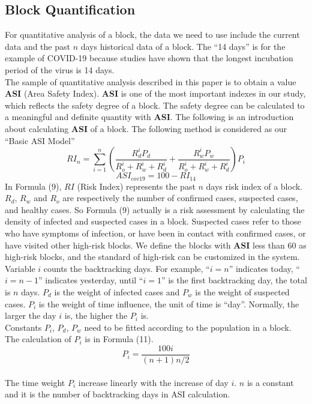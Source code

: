\documentclass[sigplan,screen]{acmart}
\begin{document}
\subsection{Block Quantification}
For quantitative analysis of a block, the data we need to use include the current data and the past $n$ days historical data of a block.
The ``14 days'' is for the example of COVID-19 because studies have shown that the longest incubation period of the virus is 14 days\cite{lauer2020incubation}.
\\
The sample of quantitative analysis described in this paper is to obtain a value \textbf{ASI} (Area Safety Index).
\textbf{ASI} is one of the most important indexes in our study, which reflects the safety degree of a block.
The safety degree can be calculated to a meaningful and definite quantity with \textbf{ASI}.
The following is an introduction about calculating \textbf{ASI} of a block.
The following method is considered as our ``Basic ASI Model''
\begin{equation}
	RI_n=\sum_{i=1}^n\left(\frac{R_d^iP_d}{R_o^i+R_w^i+R_d^i}+\frac{R_w^iP_w}{R_o^i+R_w^i+R_d^i}\right)P_i
\end{equation}
\begin{equation}
	ASI_{cov19}=100-RI_{14}
\end{equation}
In Formula (9), $RI$ (Risk Index) represents the past $n$ days risk index of a block.
$R_d$, $R_w$ and $R_o$ are respectively the number of confirmed cases, suspected cases, and healthy cases.
So Formula (9) actually is a risk assessment by calculating the density of infected and suspected cases in a block.
Suspected cases refer to those who have symptoms of infection, or have been in contact with confirmed cases, or have visited other high-risk blocks.
We define the blocks with \textbf{ASI} less than 60 as high-risk blocks, and the standard of high-risk can be customized in the system.
Variable $i$ counts the backtracking days.
For example, ``$i=n$'' indicates today, ``$i=n-1$'' indicates yesterday, until ``$i=1$'' is the first backtracking day, the total is $n$ days.
$P_d$ is the weight of infected cases and $P_w$ is the weight of suspected cases.
$P_i$ is the weight of time influence, the unit of time is ``day''.
Normally, the larger the day $i$ is, the higher the $P_i$ is.
\\
Constants $P_i$, $P_d$, $P_w$ need to be fitted according to the population in a block.
The calculation of $P_i$ is in Formula (11).
\begin{equation}
	P_i=\frac{100i}{(n+1)n/2}
\end{equation}
\\
The time weight $P_i$ increase linearly with the increase of day $i$.
$n$ is a constant and it is the number of backtracking days in ASI calculation.
\\
\end{document}
